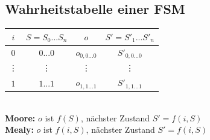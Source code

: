\documentclass[6pt,a4paper]{scrartcl}
\renewcommand{\emph}[1]{\textsf{\textbf{#1}}}
\begin{document}
\begin{multicols*}{3}
\subsection{Wahrheitstabelle einer FSM}
\begin{tabular}{c|c|c|c}
	$i$ & $S=S_0...S_n$ & $o$ & $S'=S'_1...S'_n$\\
	\hline
	$0$ & $0...0$ & $o_{0,0...0}$ & $S'_{0,0...0}$ \\
	\vdots & \vdots & \vdots & \vdots \\
	$1$ & $1...1$ & $o_{1,1...1}$ & $S'_{1,1...1}$
\end{tabular}
\\
\emph{Moore:} $o$ ist $f(S)$, nächster Zustand $S'=f(i, S)$\\
\emph{Mealy:} $o$ ist $f(i,S)$, nächster Zustand $S'=f(i, S)$

\end{multicols*}
\end{document}
